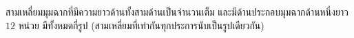\question สามเหลี่ยมมุมฉากที่มีความยาวด้านทั้งสามด้านเป็นจำนวนเต็ม และมีด้านประกอบมุมฉากด้านหนึ่งยาว $12$ หน่วย มีทั้งหมดกี่รูป (สามเหลี่ยมที่เท่ากันทุกประการนับเป็นรูปเดียวกัน)
\newline
{}
